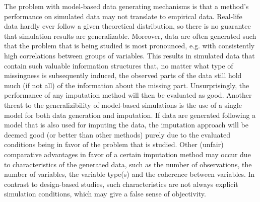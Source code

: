 \documentclass[bimj,fleqn]{w-art}
\theoremstyle{plain}
\theoremstyle{definition}
\begin{document}
The problem with model-based data generating mechanisms is that a method's performance on simulated data may not translate to empirical data. Real-life data hardly ever follow a given theoretical distribution, so there is no guarantee that simulation results are generalizable. Moreover, data are often generated such that the problem that is being studied is most pronounced, e.g. with consistently high correlations between groups of variables. This results in simulated data that contain such valuable information structures that, no matter what type of missingness is subsequently induced, the observed parts of the data still hold much (if not all) of the information about the missing part. Unsurprisingly, the performance of any imputation method will then be evaluated as good. Another threat to the generalizibility of model-based simulations is the use of a single model for both data generation and imputation. If data are generated following a model that is also used for imputing the data, the imputation approach will be deemed good (or better than other methods) purely due to the evaluated conditions being in favor of the problem that is studied. Other (unfair) comparative advantages in favor of a certain imputation method may occur due to characteristics of the generated data, such as the number of observations, the number of variables, the variable type(s) and the coherence between variables. In contrast to design-based studies, such characteristics are not always explicit simulation conditions, which may give a false sense of objectivity.
\end{document}
